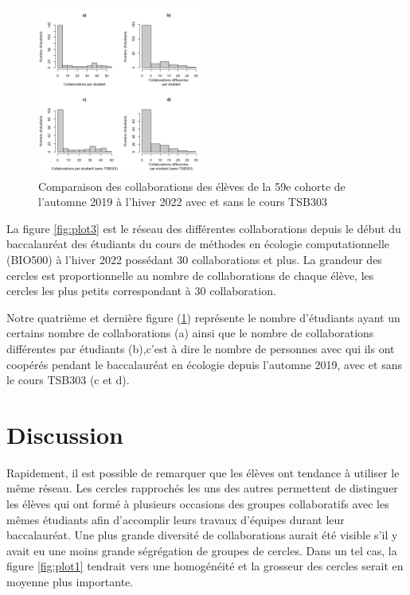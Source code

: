 \documentclass[9pt,twocolumn,twoside,]{pnas-new}
\begin{document}
\begin{figure}
\centering
\includegraphics[width=0.5\textwidth,height=0.4\textheight]{"../results/figure4.png"}
\caption{Comparaison des collaborations des élèves de la 59e cohorte de
l'automne 2019 à l'hiver 2022 avec et sans le cours TSB303
\label{fig:plot4}}
\end{figure}

La figure \ref{fig:plot3} est le réseau des différentes collaborations
depuis le début du baccalauréat des étudiants du cours de méthodes en
écologie computationnelle (BIO500) à l'hiver 2022 possédant 30
collaborations et plus. La grandeur des cercles est proportionnelle au
nombre de collaborations de chaque élève, les cercles les plus petits
correspondant à 30 collaboration.

Notre quatrième et dernière figure (\ref{fig:plot4}) représente le
nombre d'étudiants ayant un certains nombre de collaborations (a) ainsi
que le nombre de collaborations différentes par étudiants (b),c'est à
dire le nombre de personnes avec qui ils ont coopérés pendant le
baccalauréat en écologie depuis l'automne 2019, avec et sans le cours
TSB303 (c et d).

\hypertarget{discussion}{%
\section{Discussion}\label{discussion}}

Rapidement, il est possible de remarquer que les élèves ont tendance à
utiliser le même réseau. Les cercles rapprochés les uns des autres
permettent de distinguer les élèves qui ont formé à plusieurs occasions
des groupes collaboratifs avec les mêmes étudiants afin d'accomplir
leurs travaux d'équipes durant leur baccalauréat. Une plus grande
diversité de collaborations aurait été visible s'il y avait eu une moins
grande ségrégation de groupes de cercles. Dans un tel cas, la figure
\ref{fig:plot1} tendrait vers une homogénéité et la grosseur des cercles
serait en moyenne plus importante.
\end{document}
